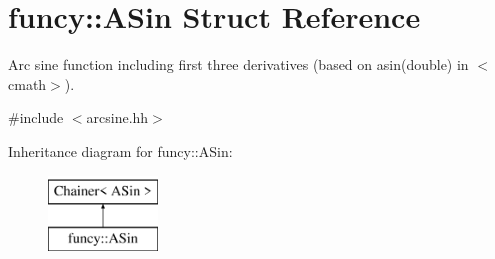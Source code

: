 \hypertarget{structfuncy_1_1ASin}{\section{funcy\-:\-:A\-Sin Struct Reference}
\label{structfuncy_1_1ASin}
}


Arc sine function including first three derivatives (based on asin(double) in $<$cmath$>$).  




{\ttfamily \#include $<$arcsine.\-hh$>$}

Inheritance diagram for funcy\-:\-:A\-Sin\-:\begin{figure}[H]
\begin{center}
\leavevmode
\includegraphics[height=2.000000cm]{structfuncy_1_1ASin}
\end{center}
\end{figure}
